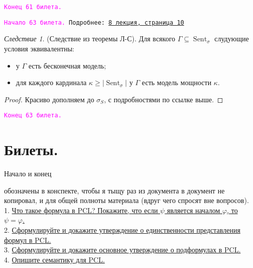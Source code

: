 \documentclass[a4paper,100pt]{article}
\theoremstyle{indented}
\theoremstyle{definition}
\theoremstyle{remark}
\newtheorem{cons}{Следствие}
\DeclareMathOperator{\Sent}{Sent}
\begin{document}
\texttt{\textcolor{magenta}{Конец 61 билета.}} 

\hrulefill

\texttt{\hypertarget{b63}{\textcolor{magenta}{Начало 63 билета.}} Подробнее: \href{http://www.mi-ras.ru/~speranski/courses/logic-1-2021-spring/slides_8.pdf}{8 лекция, страница 10}} 

\begin{cons}
  (Следствие из теоремы Л-С). Для всякого $\Gamma \subseteq \Sent_\sigma$ слудующие условия эквивалентны:

  \begin{itemize}
    \item у $\Gamma$ есть бесконечная модель; 
    \item для каждого кардинала $\kappa \geq |\Sent_\sigma|$ у $\Gamma$ есть модель мощности $\kappa$. 
  \end{itemize}
\end{cons}

\begin{proof}
  Красиво дополняем до $\sigma_S$, с подробностями по ссылке выше.
\end{proof}

\texttt{\textcolor{magenta}{Конец 63 билета.}} 

\hrulefill



\newpage

\section{Билеты.}

\hypertarget{t2}{Начало и конец} обозначены в конспекте, чтобы я тыщу раз из документа в документ не копировал, и для общей полноты материала (вдруг чего спросят вне вопросов). \\

1. \hyperlink{b1}{Что такое формула в PCL? Покажите, что если $\psi$ является началом $\varphi$, то $\psi = \varphi$.} \\ 

2. \hyperlink{b2}{Сформулируйте и докажите утверждение о единственности представления формул в PCL.} \\

3. \hyperlink{b3}{Сформулируйте и докажите основное утверждение о подформулах в PCL.} \\

4. \hyperlink{b4}{Опишите семантику для PCL.} \\
\end{document}
